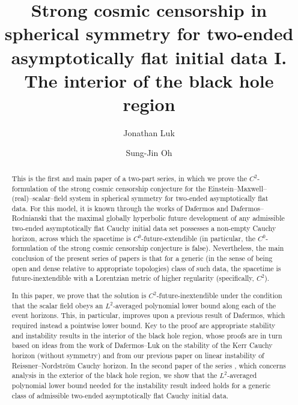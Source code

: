 \documentclass[10pt, reqno]{amsart}
\theoremstyle{definition}
\theoremstyle{remark}
\numberwithin{equation}{section}
\newcommand{\0}{\emptyset}
\begin{document}
\title[]{Strong cosmic censorship in spherical symmetry for two-ended asymptotically flat initial data I. The interior of the black hole region}%
\author{Jonathan Luk}
\address{Department of Mathematics, Stanford University, Palo Alto, CA, USA}

\author{Sung-Jin Oh}
\address{Korea Institute for Advanced Study, Seoul, Korea}


\begin{abstract}
This is the first and main paper of a two-part series, in which we prove the $C^{2}$-formulation of the strong cosmic censorship conjecture for the Einstein--Maxwell--(real)--scalar--field system in spherical symmetry for two-ended asymptotically flat data. For this model, it is known through the works of Dafermos and Dafermos--Rodnianski that the maximal globally hyperbolic future development of any admissible two-ended asymptotically flat Cauchy initial data set possesses a non-empty Cauchy horizon, across which the spacetime is $C^{0}$-future-extendible (in particular, the $C^{0}$-formulation of the strong cosmic censorship conjecture is false). Nevertheless, the main conclusion of the present series of papers is that for a generic (in the sense of being open and dense relative to appropriate topologies) class of such data, the spacetime is future-inextendible with a Lorentzian metric of higher regularity (specifically, $C^{2}$).

In this paper, we prove that the solution is $C^{2}$-future-inextendible under the condition that the scalar field obeys an $L^{2}$-averaged polynomial lower bound along each of the event horizons.
This, in particular, improves upon a previous result of Dafermos, which required instead a pointwise lower bound. 
Key to the proof are appropriate stability and instability results in the interior of the black hole region, whose proofs are in turn based on ideas from the work of Dafermos--Luk on the stability of the Kerr Cauchy horizon (without symmetry) and from our previous paper on linear instability of Reissner--Nordstr\"om Cauchy horizon. 
In the second paper of the series \cite{LO.exterior}, which concerns analysis in the exterior of the black hole region, we show that the $L^2$-averaged polynomial lower bound needed for the instability result indeed holds for a generic class of admissible two-ended asymptotically flat Cauchy initial data. 
\end{abstract}
\end{document}

